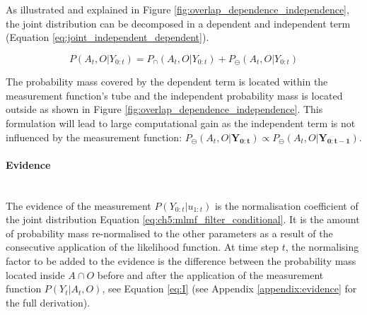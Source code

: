 As illustrated and explained in Figure \ref{fig:overlap_dependence_independence}, the joint distribution can be decomposed in a 
dependent and independent term (Equation \ref{eq:joint_independent_dependent}). 

\begin{equation}\label{eq:joint_independent_dependent}
 P(A_t,O|Y_{0:t}) = P_{\cap}(A_t,O|Y_{0:t}) + P_{\ominus}(A_t,O|Y_{0:t})
\end{equation}

The probability mass covered by the dependent term is located within the measurement function's tube and the independent probability mass 
is located outside as shown in Figure \ref{fig:overlap_dependence_independence}. This formulation will lead to large computational gain 
as the independent term is not influenced by the measurement function: 
$P_{\ominus}(A_t,O|\mathbf{Y_{0:t}}) \propto P_{\ominus}(A_t,O|\mathbf{Y_{0:t-1}})$.

\paragraph{Evidence}\\
The evidence of the measurement $P(Y_{0:t}|u_{1:t})$ is the normalisation coefficient of the joint distribution Equation \ref{eq:ch5:mlmf_filter_conditional}.
It is the amount of probability mass re-normalised to the other parameters as a result of the consecutive application of the likelihood function.
At time step $t$, the normalising factor to be added to the evidence is the difference between the probability mass located 
inside $A\cap O$ before and after the application of the measurement function $P(Y_t|A_t,O)$, 
see Equation \ref{eq:I} (see Appendix \ref{appendix:evidence} for the full derivation).

